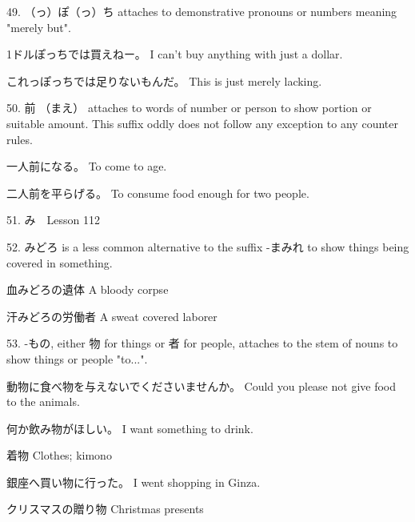 \par{49. （っ）ぽ（っ）ち attaches to demonstrative pronouns or numbers meaning "merely but". }

\par{1ドルぽっちでは買えねー。 \hfill\break
I can't buy anything with just a dollar. }

\par{これっぽっちでは足りないもんだ。 \hfill\break
This is just merely lacking. }

\par{50. 前 （まえ） attaches to words of number or person to show portion or suitable amount. This suffix oddly does not follow any exception to any counter rules. }

\par{一人前になる。 \hfill\break
To come to age. }

\par{二人前を平らげる。 \hfill\break
To consume food enough for two people. }

\par{51. み　\textrightarrow  Lesson 112  }

\par{52. みどろ is a less common alternative to the suffix -まみれ to show things being covered in something. }

\par{血みどろの遺体 \hfill\break
A bloody corpse }

\par{汗みどろの労働者 \hfill\break
A sweat covered laborer }

\par{53. -もの, either 物 for things or 者 for people, attaches to the stem of nouns to show things or people "to\dothyp{}\dothyp{}\dothyp{}". }

\par{動物に食べ物を与えないでくださいませんか。 \hfill\break
Could you please not give food to the animals. }

\par{何か飲み物がほしい。 \hfill\break
I want something to drink. }

\par{着物 \hfill\break
Clothes; kimono }

\par{銀座へ買い物に行った。 \hfill\break
I went shopping in Ginza. }

\par{クリスマスの贈り物 \hfill\break
Christmas presents }

